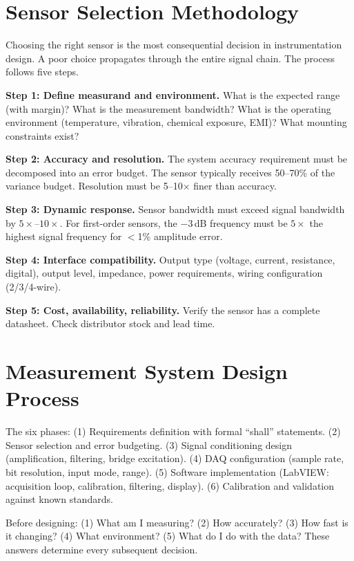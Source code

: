 \documentclass[11pt,letterpaper,twoside,openany]{book}
\begin{document}
\section{Sensor Selection Methodology}
Choosing the right sensor is the most consequential decision in instrumentation design. A poor choice propagates through the entire signal chain. The process follows five steps.

\textbf{Step 1: Define measurand and environment.} What is the expected range (with margin)? What is the measurement bandwidth? What is the operating environment (temperature, vibration, chemical exposure, EMI)? What mounting constraints exist?

\textbf{Step 2: Accuracy and resolution.} The system accuracy requirement must be decomposed into an error budget. The sensor typically receives 50--70\% of the variance budget. Resolution must be 5--10$\times$ finer than accuracy.

\textbf{Step 3: Dynamic response.} Sensor bandwidth must exceed signal bandwidth by $5\times$--$10\times$. For first-order sensors, the $-3$\,dB frequency must be $5\times$ the highest signal frequency for $<$1\% amplitude error.

\textbf{Step 4: Interface compatibility.} Output type (voltage, current, resistance, digital), output level, impedance, power requirements, wiring configuration (2/3/4-wire).

\textbf{Step 5: Cost, availability, reliability.} Verify the sensor has a complete datasheet. Check distributor stock and lead time.

\section{Measurement System Design Process}
The six phases: (1) Requirements definition with formal ``shall'' statements. (2) Sensor selection and error budgeting. (3) Signal conditioning design (amplification, filtering, bridge excitation). (4) DAQ configuration (sample rate, bit resolution, input mode, range). (5) Software implementation (LabVIEW: acquisition loop, calibration, filtering, display). (6) Calibration and validation against known standards.

\begin{tipbox}
Before designing: (1) What am I measuring? (2) How accurately? (3) How fast is it changing? (4) What environment? (5) What do I do with the data? These answers determine every subsequent decision.
\end{tipbox}
\end{document}
